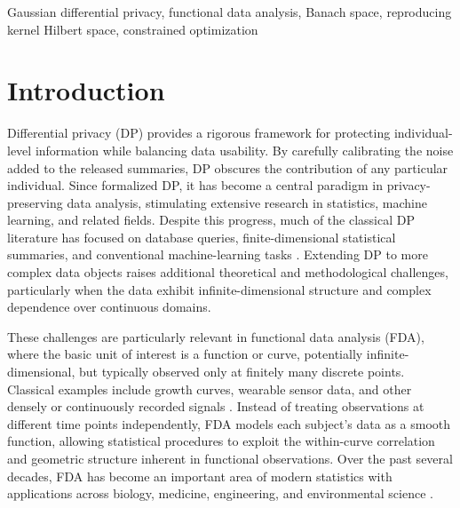 \documentclass[twoside,11pt]{article}
\begin{document}
\begin{keywords}
  Gaussian differential privacy, functional data analysis, Banach space, reproducing kernel Hilbert space, constrained optimization
\end{keywords}

\section{Introduction}
Differential privacy (DP) provides a rigorous framework for protecting individual-level information while balancing data usability. By carefully calibrating the noise added to the released summaries, DP obscures the contribution of any particular individual. Since \citet{dwork2006calibrating} formalized DP, it has become a central paradigm in privacy-preserving data analysis, stimulating extensive research in statistics, machine learning, and related fields. Despite this progress, much of the classical DP literature has focused on database queries, finite-dimensional statistical summaries, and conventional machine-learning tasks \citep{wasserman2010statistical, chaudhuri2011differentially, dwork2014algorithmic}. Extending DP to more complex data objects raises additional theoretical and methodological challenges, particularly when the data exhibit infinite-dimensional structure and complex dependence over continuous domains.

These challenges are particularly relevant in functional data analysis (FDA), where the basic unit of interest is a function or curve, potentially infinite-dimensional, but typically observed only at finitely many discrete points. Classical examples include growth curves, wearable sensor data, and other densely or continuously recorded signals \citep{wang2016functional,ramsay2005functional,acar2025functional}. Instead of treating observations at different time points independently, FDA models each subject's data as a smooth function, allowing statistical procedures to exploit the within-curve correlation and geometric structure inherent in functional observations. Over the past several decades, FDA has become an important area of modern statistics with applications across biology, medicine, engineering, and environmental science \citep{ferraty2006nonparametric, kokoszka2017introduction}.
\end{document}
